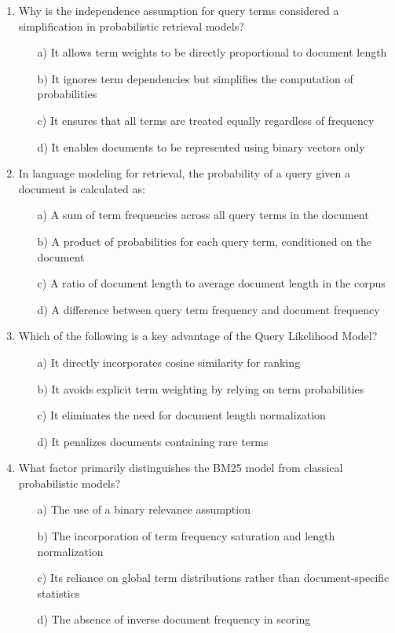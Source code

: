 \documentclass[8pt]{extarticle}
\begin{document}
\begin{multicols}{2}
\begin{enumerate}
\item Why is the independence assumption for query terms considered a simplification in probabilistic retrieval models?
\begin{itemize}
    \item[a)] It allows term weights to be directly proportional to document length
    \item[b)] It ignores term dependencies but simplifies the computation of probabilities
    \item[c)] It ensures that all terms are treated equally regardless of frequency
    \item[d)] It enables documents to be represented using binary vectors only
\end{itemize}
 

\item In language modeling for retrieval, the probability of a query given a document is calculated as:
\begin{itemize}
    \item[a)] A sum of term frequencies across all query terms in the document
    \item[b)] A product of probabilities for each query term, conditioned on the document
    \item[c)] A ratio of document length to average document length in the corpus
    \item[d)] A difference between query term frequency and document frequency
\end{itemize}
 

\item Which of the following is a key advantage of the Query Likelihood Model?
\begin{itemize}
    \item[a)] It directly incorporates cosine similarity for ranking
    \item[b)] It avoids explicit term weighting by relying on term probabilities
    \item[c)] It eliminates the need for document length normalization
    \item[d)] It penalizes documents containing rare terms
\end{itemize}
 

\item What factor primarily distinguishes the BM25 model from classical probabilistic models?
\begin{itemize}
    \item[a)] The use of a binary relevance assumption
    \item[b)] The incorporation of term frequency saturation and length normalization
    \item[c)] Its reliance on global term distributions rather than document-specific statistics
    \item[d)] The absence of inverse document frequency in scoring
\end{itemize}
 


\end{enumerate}
\end{multicols}
\end{document}
